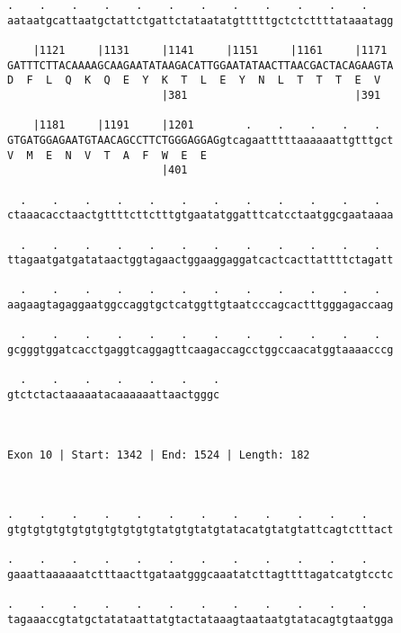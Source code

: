 \documentclass{article}
\begin{document}
\begin{Verbatim}
.    .    .    .    .    .    .    .    .    .    .    .    
aataatgcattaatgctattctgattctataatatgtttttgctctcttttataaatagg
                                                            
    |1121     |1131     |1141     |1151     |1161     |1171 
GATTTCTTACAAAAGCAAGAATATAAGACATTGGAATATAACTTAACGACTACAGAAGTA
D  F  L  Q  K  Q  E  Y  K  T  L  E  Y  N  L  T  T  T  E  V  
                        |381                          |391  
  
    |1181     |1191     |1201        .    .    .    .    .  
GTGATGGAGAATGTAACAGCCTTCTGGGAGGAGgtcagaatttttaaaaaattgtttgct
V  M  E  N  V  T  A  F  W  E  E                             
                        |401                                
  
  .    .    .    .    .    .    .    .    .    .    .    .  
ctaaacacctaactgttttcttctttgtgaatatggatttcatcctaatggcgaataaaa
                                                            
  .    .    .    .    .    .    .    .    .    .    .    .  
ttagaatgatgatataactggtagaactggaaggaggatcactcacttattttctagatt
                                                            
  .    .    .    .    .    .    .    .    .    .    .    .  
aagaagtagaggaatggccaggtgctcatggttgtaatcccagcactttgggagaccaag
                                                            
  .    .    .    .    .    .    .    .    .    .    .    .  
gcgggtggatcacctgaggtcaggagttcaagaccagcctggccaacatggtaaaacccg
                                                            
  .    .    .    .    .    .    .
gtctctactaaaaatacaaaaaattaactgggc
                                 
                                 
 
Exon 10 | Start: 1342 | End: 1524 | Length: 182



.    .    .    .    .    .    .    .    .    .    .    .    
gtgtgtgtgtgtgtgtgtgtgtgtatgtgtatgtatacatgtatgtattcagtctttact
                                                            
.    .    .    .    .    .    .    .    .    .    .    .    
gaaattaaaaaatctttaacttgataatgggcaaatatcttagttttagatcatgtcctc
                                                            
.    .    .    .    .    .    .    .    .    .    .    .    
tagaaaccgtatgctatataattatgtactataaagtaataatgtatacagtgtaatgga
                                                            

\end{Verbatim}
\end{document}
